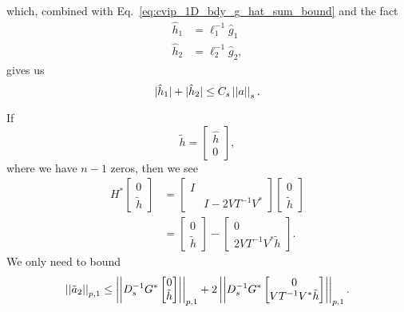 %
which, combined with Eq.~\eqref{eq:cvip_1D_bdy_g_hat_sum_bound}
and the fact
%
\begin{align}
    \hat{h}_{1} &= \ell_{1}^{-1}\hat{g}_{1} \nonumber\\
    \hat{h}_{2} &= \ell_{2}^{-1}\hat{g}_{2},
\end{align}
%
gives us
%
\begin{equation}
    |\hat{h}_{1}| + |\hat{h}_{2}| \le C_{s}\left| \left| a \right| \right|_{s}.
    \label{eq:cvip_interp_1D_bdy_h_bound}
\end{equation}

If
%
\begin{equation}
    \tilde{h} = \begin{bmatrix} \hat{h} \\ 0 \end{bmatrix},
\end{equation}
%
where we have $n-1$ zeros, then we see
%
\begin{align}
    H^{*}\begin{bmatrix} 0 \\ \tilde{h} \end{bmatrix}
        &= \begin{bmatrix} I & \\ & I - 2VT^{-1}V^{*} \end{bmatrix}
        \begin{bmatrix} 0 \\ \tilde{h} \end{bmatrix} \nonumber\\
    &= \begin{bmatrix} 0 \\ \tilde{h} \end{bmatrix} -
        \begin{bmatrix} 0 \\ 2VT^{-1}V^{*}\tilde{h} \end{bmatrix}.
\end{align}
%
We only need to bound
%
\begin{equation}
    \left| \left| \tilde{a}_{2} \right| \right|_{p,1} \le \left| \left| D_{s}^{-1}G^{*}
        \begin{bmatrix} 0 \\ \tilde{h}\end{bmatrix} \right| \right|_{p,1}
    + 2\left| \left| D_{s}^{-1}G^{*}
        \begin{bmatrix} 0 \\ VT^{-1}V^{*}\tilde{h}\end{bmatrix} \right| \right|_{p,1}.
\end{equation}

